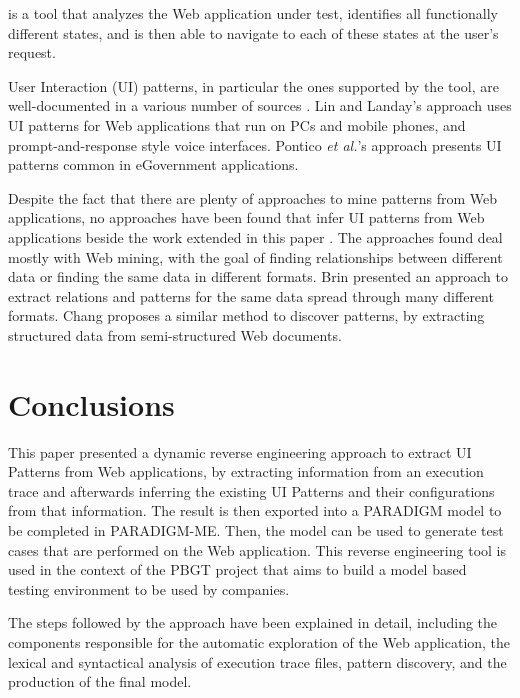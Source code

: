 \documentclass[conference]{IEEEtran}
\begin{document}
\cite{dallmeier2012Webmate,dallmeier2013Webmate} is a tool that analyzes the Web application under test, identifies all functionally different states, and is then able to navigate to each of these states at the user’s request.

User Interaction (UI) patterns, in particular the ones supported by the tool, are well-documented in a various number of sources \cite{tidwell2010designing, van2001patterns, neil12standard,sinnig2005patterns}. Lin and Landay's approach \cite{lin2008employing} uses UI patterns for Web applications that run on PCs and mobile phones, and prompt-and-response style voice interfaces. Pontico \textit{et al.}'s approach \cite{pontico2008organizing} presents UI patterns common in eGovernment applications.

Despite the fact that there are plenty of approaches to mine patterns from Web applications, no approaches have been found that infer UI patterns from Web applications beside the work extended in this paper \cite{nabuco2013inferring, morgado2012gui}. The approaches found deal mostly with Web mining, with the goal of finding relationships between different data or finding the same data in different formats. Brin \cite{brin1999extracting} presented an approach to extract relations and patterns for the same data spread through many different formats. Chang \cite{chang2003automatic} proposes a similar method to discover patterns, by extracting structured data from semi-structured Web documents.

\section{Conclusions}\label{sec:conc}
This paper presented a dynamic reverse engineering approach to extract UI Patterns from Web applications, by extracting information from an execution trace and afterwards inferring the existing UI Patterns and their configurations from that information. The result is then exported into a PARADIGM
model to be completed in PARADIGM-ME. Then, the model can be used to generate test cases that are performed on the Web application. This reverse engineering tool is used in the context of the PBGT project that aims to build a model based testing environment to be used by companies. 

The steps followed by the approach have been explained in detail,  including the components responsible for the automatic exploration of the Web application, the lexical and syntactical analysis of execution trace files, pattern discovery, and the production of the final model.
\end{document}
